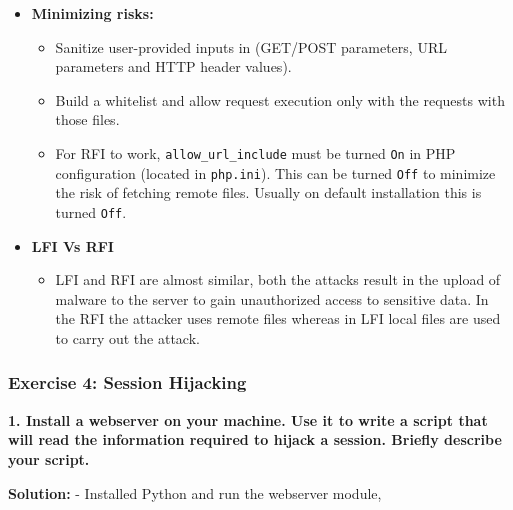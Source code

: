 \begin{itemize}
\tightlist
\item
  \textbf{Minimizing risks:}

  \begin{itemize}
  \tightlist
  \item
    Sanitize user-provided inputs in (GET/POST parameters, URL
    parameters and HTTP header values).
  \item
    Build a whitelist and allow request execution only with the requests
    with those files.
  \item
    For RFI to work, \texttt{allow\_url\_include} must be turned
    \texttt{On} in PHP configuration (located in \texttt{php.ini}). This
    can be turned \texttt{Off} to minimize the risk of fetching remote
    files. Usually on default installation this is turned \texttt{Off}.
  \end{itemize}
\item
  \textbf{LFI Vs RFI}

  \begin{itemize}
  \tightlist
  \item
    LFI and RFI are almost similar, both the attacks result in the
    upload of malware to the server to gain unauthorized access to
    sensitive data. In the RFI the attacker uses remote files whereas in
    LFI local files are used to carry out the attack.
  \end{itemize}
\end{itemize}

\hypertarget{exercise-4-session-hijacking}{%
\subsubsection{Exercise 4: Session
Hijacking}\label{exercise-4-session-hijacking}}

\textbf{1. Install a webserver on your machine. Use it to write a script
that will read the information required to hijack a session. Briefly
describe your script.}

\textbf{Solution:} - Installed Python and run the webserver module,

\begin{Shaded}
\begin{Highlighting}[]
    \ExtensionTok{$}
        \ErrorTok{(}\KeywordTok{)}
\end{Highlighting}
\end{Shaded}


